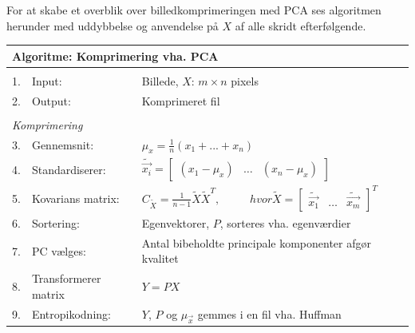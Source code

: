 For at skabe et overblik over billedkomprimeringen med PCA ses algoritmen herunder med uddybbelse og anvendelse på $X$ af alle skridt efterfølgende.

\begin{table}[!h]
\centering
\begin{tabular}{lll}
\hline
\multicolumn{3}{l}{\textbf{Algoritme: Komprimering vha. PCA}}\\                                                             \hline
\\
\multicolumn{1}{|l}{1.}        & Input:                     & Billede, $X$: $m \times n$ pixels                                   \\
\multicolumn{1}{|l}{2.}        & Output:                    & Komprimeret fil                                           \\
                               &                            &                                                                   \\
\multicolumn{2}{|l}{\textit{Komprimering}}                 &                                                                   \\
\multicolumn{1}{|l}{3.}        & Gennemsnit:                  & $\mu_{x} = \frac{1}{n}(x_1+ ... + x_n)$           \\
\multicolumn{1}{|l}{4.}        & Standardiserer:			 & 
$\tilde{\vec{x_i}} = \begin{bmatrix} (x_1 - \mu_{x}) & \hdots & (x_n - \mu_{x}) \end{bmatrix}$          \\
\multicolumn{1}{|l}{5.}        & Kovarians matrix:              & 
$C_{\tilde{X}}=\frac{1}{n-1} \tilde{X}\tilde{X}^T , \phantom{mmm} hvor \tilde{X}= \begin{bmatrix} \tilde{\vec{x_1}} &		\hdots & \tilde{\vec{x_m}}  \end{bmatrix}^T$           \\
\multicolumn{1}{|l}{6.}        & Sortering:              & Egenvektorer, $P$, sorteres vha. egenværdier \\
\multicolumn{1}{|l}{7.}        & PC vælges:    			& 
Antal bibeholdte principale komponenter afgør kvalitet  \\
\multicolumn{1}{|l}{8.}        & Transformerer matrix          & 
$Y = PX$            \\
\multicolumn{1}{|l}{9.}        & Entropikodning:        & $Y$, $P$ og $\mu_{\vec{x}}$ gemmes i en fil vha. Huffman     \\
\end{tabular}
\label{tb:Algoritme-Komprimering-PCA}
\end{table}

